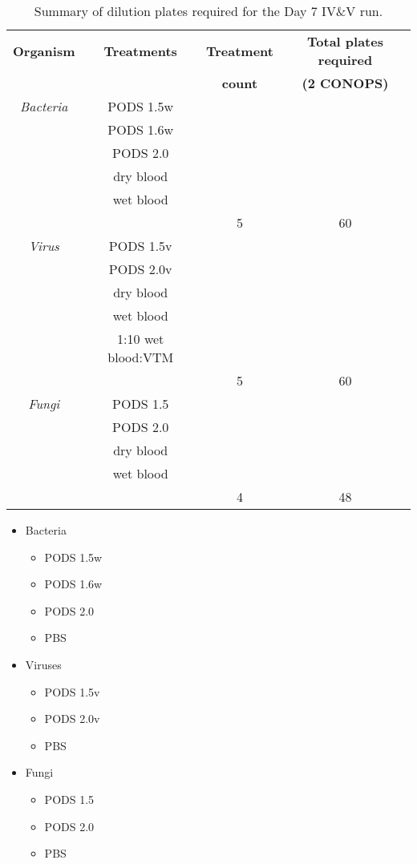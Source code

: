 \documentclass{article}
\begin{document}
\begin{table}
  \centering
  \begin{tabular}[]{c|c|c|c}
    \textbf{Organism} & \textbf{Treatments} & \textbf{Treatment} & \textbf{Total plates required} \\
     &  & \textbf{count} & \textbf{(2 CONOPS)} \\
    \hline
    \textit{Bacteria} & PODS 1.5w  & & \\
     & PODS 1.6w  & & \\
     & PODS 2.0  & & \\
     & dry blood  & & \\
     & wet blood  & & \\
    \hline
    & & 5 & 60\\
    \hline
    \textit{Virus} & PODS 1.5v  & & \\
     & PODS 2.0v  & & \\
     & dry blood  & & \\
     & wet blood  & & \\
             & 1:10 wet blood:VTM  & & \\
    \hline
    & & 5 & 60\\
    \hline
    \textit{Fungi} & PODS 1.5  & & \\
     & PODS 2.0  & & \\
     & dry blood  & & \\
     & wet blood  & & \\
    \hline
    & & 4 & 48\\
    \hline

  \end{tabular}
  \caption{Summary of dilution plates required for the Day 7 IV\&V run.}
  \label{tab:dilution-plan-day-7}
\end{table}

\begin{itemize}
    \item Bacteria
        \begin{itemize}
            \item PODS 1.5w
            \item PODS 1.6w
            \item PODS 2.0
            \item PBS
        \end{itemize}
    \item Viruses
        \begin{itemize}
            \item PODS 1.5v
            \item PODS 2.0v
            \item PBS
        \end{itemize}
    \item Fungi
        \begin{itemize}
            \item PODS 1.5
            \item PODS 2.0
            \item PBS
        \end{itemize}
\end{itemize}
\end{document}
